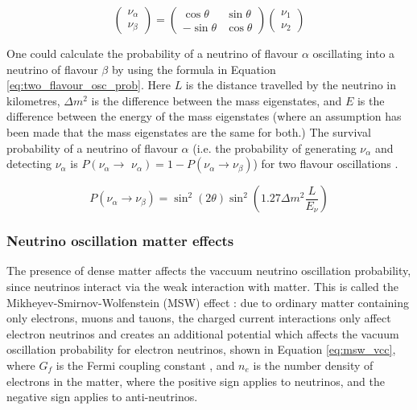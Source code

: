 $$
\left(\begin{array}{l}
\nu_{\alpha} \\
\nu_{\beta}
\end{array}\right)=\left(\begin{array}{cc}
\cos \theta & \sin \theta \\
-\sin \theta & \cos \theta
\end{array}\right)\left(\begin{array}{l}
\nu_{1} \\
\nu_{2}
\end{array}\right)
\label{eq:rotation matrix}
$$


One could calculate the probability of a neutrino of flavour $\alpha$ oscillating into a neutrino of flavour $\beta$ by using the formula in Equation \ref{eq:two_flavour_osc_prob}. Here $L$ is the distance travelled by the neutrino in kilometres, $\Delta m^{2}$ is the difference between the mass eigenstates, and $E$ is the difference between the energy of the mass eigenstates (where an assumption has been made that the mass eigenstates are the same for both.) The survival probability of a neutrino of flavour $\alpha$ (i.e. the probability of generating $\nu_{\alpha}$ and detecting $\nu_{\alpha}$ is $P\left(\nu_{\alpha} \rightarrow\right.$ $\left.\nu_{\alpha}\right)=1-P\left(\nu_{\alpha} \rightarrow \nu_{\beta}\right)$) for two flavour oscillations \cite{RevModPhys.59.671}. 

\begin{equation}
P\left(\nu_{\alpha} \rightarrow \nu_{\beta}\right)=\sin ^{2}(2 \theta) \sin ^{2}\left(1.27 \Delta m^{2} \frac{L}{E_{\nu}}\right)
\label{eq:two_flavour_osc_prob}
\end{equation}

\subsubsection{Neutrino oscillation matter effects}

The presence of dense matter affects the vaccuum neutrino oscillation probability, since neutrinos interact via the weak interaction with matter. This is called the Mikheyev-Smirnov-Wolfenstein (MSW) effect \cite{Smirnov_2005}: due to ordinary matter containing only electrons, muons and tauons, the charged current interactions only affect electron neutrinos and creates an additional potential which affects the vacuum oscillation probability for electron neutrinos, shown in Equation \ref{eq:msw_vcc}, where $G_{f}$ is the Fermi coupling constant \cite{van2000precise}, and $n_{e}$ is the number density of electrons in the matter, where the positive sign applies to neutrinos, and the negative sign applies to anti-neutrinos. 

